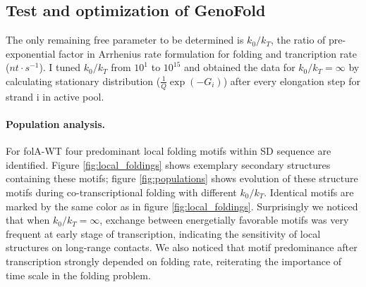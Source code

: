 \documentclass[11pt, a4paper]{article}
\begin{document}
\subsection{Test and optimization of GenoFold}

The only remaining free parameter to be determined is $k_0/k_T$, the ratio of pre-exponential factor in Arrhenius rate formulation for folding and trancription rate ($nt\cdot s^{-1}$). I tuned $k_0/k_T$ from $10^{1}$ to $10^{15}$ and obtained the data for $k_0/k_T=\infty$ by calculating stationary distribution ($\frac{1}{Q}\exp(-G_i)$) after every elongation step for strand i in active pool.

\paragraph{Population analysis.} For folA-WT four predominant local folding motifs within SD sequence are identified. Figure \ref{fig:local_foldings} shows exemplary secondary structures containing these motifs; figure \ref{fig:populations} shows evolution of these structure motifs during co-transcriptional folding with different $k_0/k_T$. Identical motifs are marked by the same color as in figure \ref{fig:local_foldings}. Surprisingly we noticed that when $k_0/k_T=\infty$, exchange between energetially favorable motifs was very frequent at early stage of transcription, indicating the sensitivity of local structures on long-range contacts. We also noticed that motif predominance after transcription strongly depended on folding rate, reiterating the importance of time scale in the folding problem.
\end{document}
